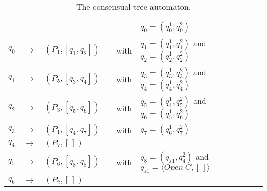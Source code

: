\begin{table}[ht]
	\caption{The consensual tree automaton.}
	\label{chap2:table:automaton-a-b-c}
	\begin{tabular}[t]{|lcp{5.7cm}|lcp{5cm}|}
	\hline
	& & & & & $q_{0}=(q_{0}^{1}, q_{0}^{2})$\\
	\hline
	$q_{0}$ & $\longrightarrow$ & $(P_{1}, [q_{1}, q_{2}])$ & & with & $q_{1}=(q_{1}^{1}, q_{1}^{2})$ and $q_{2}=(q_{2}^{1}, q_{2}^{2})$\\
	\hline
	
	$q_{1}$ & $\longrightarrow$ & $(P_{5}, [q_{3}, q_{4}])$ & & with & $q_{3}=(q_{3}^{1}, q_{3}^{2})$ and $q_{4}=(q_{4}^{1}, q_{4}^{2})$\\
	
	\hline
	
	$q_{2}$ & $\longrightarrow$ & $(P_{3}, [q_{5}, q_{6}])$ & & with & $q_{5}=(q_{4}^{1}, q_{5}^{2})$ and $q_{6}=(q_{5}^{1}, q_{6}^{2})$\\
	
	\hline
	
	$q_{3}$ & $\longrightarrow$ & $(P_{1}, [q_{4}, q_{7}])$ & & with & $q_{7}=(q_{6}^{1}, q_{7}^{2})$\\
	
	\hline
	
	$q_{4}$ & $\longrightarrow$ & $(P_{7}, [\,])$ & & &\\
	
	\hline
	
	$q_{5}$ & $\longrightarrow$ & $(P_{6}, [q_{8}, q_{8}])$ & & with & $q_8=(q_{s1}, q^2_4)$ and $q_{s1}=\langle Open~C,[\,] \rangle $\\
	
	\hline
	
	$q_{6}$ & $\longrightarrow$ & $(P_{2}, [\,])$ & & &\\
	

\end{tabular}
\end{table}
